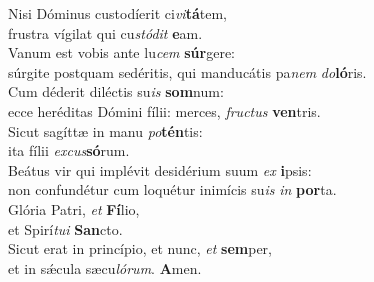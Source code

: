 \evenverse Nisi Dóminus custodíerit ci\textit{vi}\textbf{tá}tem,~\*\\
\evenverse frustra vígilat qui cu\textit{stó}\textit{dit} \textbf{e}am.\\
\oddverse Vanum est vobis ante lu\textit{cem} \textbf{súr}gere:~\*\\
\oddverse súrgite postquam sedéritis, qui manducátis pa\textit{nem} \textit{do}\textbf{ló}ris.\\
\evenverse Cum déderit diléctis su\textit{is} \textbf{som}num:~\*\\
\evenverse ecce heréditas Dómini fílii: merces, \textit{fru}\textit{ctus} \textbf{ven}tris.\\
\oddverse Sicut sagíttæ in manu \textit{po}\textbf{tén}tis:~\*\\
\oddverse ita fílii \textit{ex}\textit{cus}\textbf{só}rum.\\
\evenverse Beátus vir qui implévit desidérium suum \textit{ex} \textbf{i}psis:~\*\\
\evenverse non confundétur cum loquétur inimícis su\textit{is} \textit{in} \textbf{por}ta.\\
\oddverse Glória Patri, \textit{et} \textbf{Fí}lio,~\*\\
\oddverse et Spirí\textit{tu}\textit{i} \textbf{San}cto.\\
\evenverse Sicut erat in princípio, et nunc, \textit{et} \textbf{sem}per,~\*\\
\evenverse et in sǽcula sæcu\textit{ló}\textit{rum}. \textbf{A}men.\\
